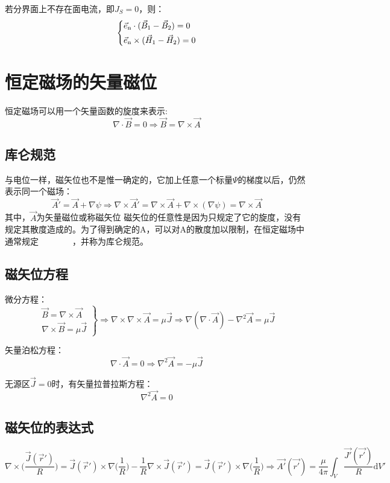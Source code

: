 若分界面上不存在面电流，即$J_S = 0$，则：
\[\left\{ \begin{gathered}
{{\vec e}_{\text{n}}} \cdot ({{\vec B}_1} - {{\vec B}_2}) = 0 \hfill \\
{{\vec e}_{\text{n}}} \times ({{\vec H}_1} - {{\vec H}_2}) = 0 \hfill \\ 
\end{gathered}  \right.\]

\section{恒定磁场的矢量磁位}
恒定磁场可以用一个矢量函数的旋度来表示:
\[\nabla  \cdot \vec B = 0 \Rightarrow \vec B = \nabla  \times \vec A\]

\subsection*{库仑规范}
与电位一样，磁矢位也不是惟一确定的，它加上任意一个标量$\varPsi$的梯度以后，仍然表示同一个磁场：
\[\vec A' = \vec A + \nabla \psi \Rightarrow \nabla  \times \vec A' = \nabla  \times \vec A + \nabla  \times (\nabla \psi ) = \nabla  \times \vec A\]
其中，$\vec{A}$为矢量磁位或称磁矢位
磁矢位的任意性是因为只规定了它的旋度，没有规定其散度造成的。为了得到确定的A，可以对A的散度加以限制，在恒定磁场中通常规定　　　　，并称为库仑规范。

\subsection*{磁矢位方程}
微分方程：
\[\left.
\begin{aligned}
	\vec{B} = \nabla \times \vec{A} \\
	\nabla \times \vec{B} = \mu \vec{J}
\end{aligned}
\right\} \Rightarrow \nabla \times \nabla \times \vec{A} = \mu \vec{J} \Rightarrow \nabla (\nabla \cdot \vec{A}) - \nabla^2\vec{A} = \mu \vec{J}\]

矢量泊松方程：
\[ \nabla \cdot \vec{A} = 0 \Rightarrow \nabla^2 \vec{A} = -\mu\vec{J} \]

无源区$\vec{J} = 0$时，有矢量拉普拉斯方程：
\[ \nabla^2 \vec{A} = 0 \]

\subsection*{磁矢位的表达式}
\[\nabla  \times (\frac{{\vec J(\vec r')}}
{R}{\text{)}} = \vec J(\vec r') \times \nabla (\frac{1}
{R}{\text{)}} - \frac{1}
{R}\nabla  \times \vec J(\vec r') = \vec J(\vec r') \times \nabla (\frac{1}
{R}{\text{)}} \Rightarrow \vec{A'}(\vec{r'}) = \frac{\mu}{4\pi} \int_V \frac{\vec{J'}(\vec{r'})}{R} \mathrm{d}V' \]

